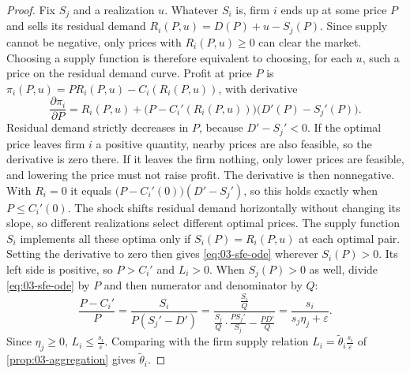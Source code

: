 \begin{proof}
Fix $S_j$ and a realization $u$. Whatever $S_i$ is, firm $i$ ends up at some price $P$ and sells its residual demand
$R_i(P, u) = D(P) + u - S_j(P)$. Since supply cannot be negative, only prices with $R_i(P, u) \ge 0$ can clear the
market. Choosing a supply function is therefore equivalent to choosing, for each $u$, such a price on the residual
demand curve. Profit at price $P$ is $\pi_i(P, u) = P R_i(P, u) - C_i(R_i(P, u))$, with derivative
\begin{equation*}
\frac{\partial \pi_i}{\partial P} = R_i(P, u) + \bigl(P - C_i'(R_i(P, u))\bigr)\bigl(D'(P) - S_j'(P)\bigr).
\end{equation*}
Residual demand strictly decreases in $P$, because $D' - S_j' < 0$. If the optimal price leaves firm $i$ a positive
quantity, nearby prices are also feasible, so the derivative is zero there. If it leaves the firm nothing, only lower
prices are feasible, and lowering the price must not raise profit. The derivative is then nonnegative. With
$R_i = 0$ it equals $\bigl(P - C_i'(0)\bigr)(D' - S_j')$, so this holds exactly when $P \le C_i'(0)$.
The shock shifts residual demand horizontally without changing its slope, so different realizations select different
optimal prices. The supply function $S_i$ implements all these optima only if $S_i(P) = R_i(P, u)$ at each optimal pair.
Setting the derivative to zero then gives \eqref{eq:03-sfe-ode} wherever $S_i(P) > 0$. Its left side is positive, so
$P > C_i'$ and $L_i > 0$. When $S_j(P) > 0$ as well, divide \eqref{eq:03-sfe-ode} by $P$ and then numerator and
denominator by $Q$:
\begin{equation*}
\frac{P - C_i'}{P} = \frac{S_i}{P(S_j' - D')} = \frac{\frac{S_i}{Q}}{\frac{S_j}{Q}\cdot\frac{P S_j'}{S_j} -
\frac{P D'}{Q}} = \frac{s_i}{s_j\eta_j + \varepsilon}.
\end{equation*}
Since $\eta_j \ge 0$, $L_i \le \frac{s_i}{\varepsilon}$. Comparing with the firm supply relation
$L_i = \tilde\theta_i\frac{s_i}{\varepsilon}$ of \cref{prop:03-aggregation} gives $\tilde\theta_i$.
\end{proof}

